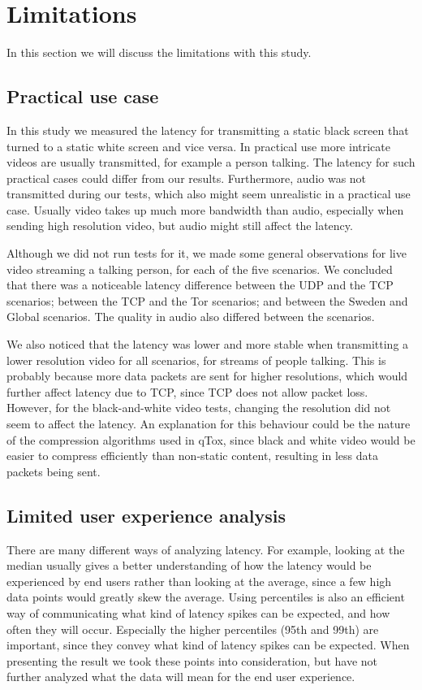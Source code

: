 \documentclass{kththesis}
\begin{document}
\section{Limitations}
\label{section:limitations}
In this section we will discuss the limitations with this study.

\subsection{Practical use case}
\label{section:practicaluse}
In this study we measured the latency for transmitting a static black screen that turned to a static white screen and vice versa. In practical use more intricate videos are usually transmitted, for example a person talking. The latency for such practical cases could differ from our results. Furthermore, audio was not transmitted during our tests, which also might seem unrealistic in a practical use case. Usually video takes up much more bandwidth than audio, especially when sending high resolution video, but audio might still affect the latency.

Although we did not run tests for it, we made some general observations for live video streaming a talking person, for each of the five scenarios. We concluded that there was a noticeable latency difference between the UDP and the TCP scenarios; between the TCP and the Tor scenarios; and between the Sweden and Global scenarios. The quality in audio also differed between the scenarios.

We also noticed that the latency was lower and more stable when transmitting a lower resolution video for all scenarios, for streams of people talking. This is probably because more data packets are sent for higher resolutions, which would further affect latency due to TCP, since TCP does not allow packet loss. However, for the black-and-white video tests, changing the resolution did not seem to affect the latency. An explanation for this behaviour could be the nature of the compression algorithms used in qTox, since black and white video would be easier to compress efficiently than non-static content, resulting in less data packets being sent.

\subsection{Limited user experience analysis}
There are many different ways of analyzing latency. For example, looking at the median usually gives a better understanding of how the latency would be experienced by end users rather than looking at the average, since a few high data points would greatly skew the average. Using percentiles is also an efficient way of communicating what kind of latency spikes can be expected, and how often they will occur. Especially the higher percentiles (95th and 99th) are important, since they convey what kind of latency spikes can be expected. When presenting the result we took these points into consideration, but have not further analyzed what the data will mean for the end user experience.
\end{document}
